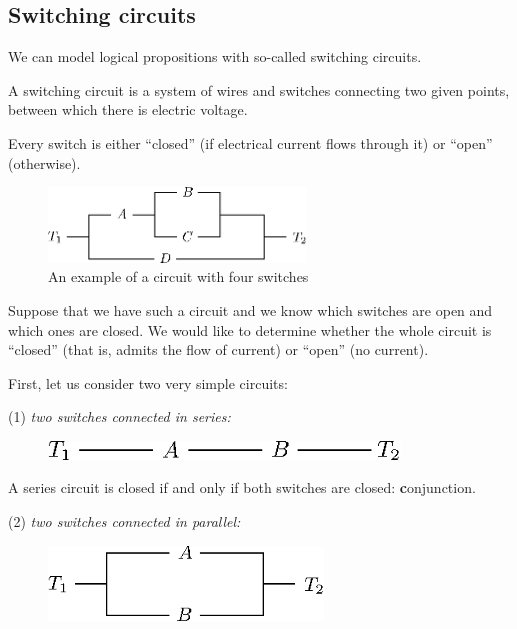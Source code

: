 \documentclass[11pt,paper=b5,footinclude,headinclude]{scrbook} %
\theoremstyle{remark}
\theoremstyle{definition} %
\begin{document}
\subsection{Switching circuits}

We can model logical propositions with so-called switching circuits.

A switching circuit is a system of wires and switches connecting two given points,
between which there is electric voltage.

Every switch is either ``closed'' (if electrical current flows through it) or ``open'' (otherwise).

\begin{figure}[h!]
\begin{center}
\includegraphics[height=20mm]{vezje.eps}
\caption{An example of a circuit with four switches}\label{fig:vezje}
\end{center}
\end{figure}

Suppose that we have such a circuit and we know which switches are open and which ones are closed.
We would like to determine whether the whole circuit is ``closed'' (that is, admits the flow of current)
or ``open'' (no current).

\medskip
First, let us consider two very simple circuits:

(1) {\em two switches connected in series:}
\begin{figure}[h!]
\begin{center}
\includegraphics[height=5mm]{vezje-zaporedno.eps}\label{fig:vezje-zap}
\end{center}
\end{figure}

A series circuit is closed if and only if both switches are closed: {\textbf conjunction}.

(2) {\em two switches connected in parallel:}

\begin{figure}[h!]
\begin{center}
\includegraphics[height=20mm]{vezje-vzporedno.eps}\label{fig:vezje-vzp}
\end{center}
\end{figure}
\end{document}
